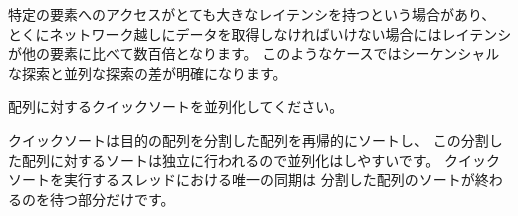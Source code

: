 特定の要素へのアクセスがとても大きなレイテンシを持つという場合があり、
とくにネットワーク越しにデータを取得しなければいけない場合にはレイテンシが他の要素に比べて数百倍となります。
このようなケースではシーケンシャルな探索と並列な探索の差が明確になります。
\medskip
\begin{exercise}
\label{ex/qsort}
配列に対するクイックソートを並列化してください。
\end{exercise}
\begin{answer}
クイックソートは目的の配列を分割した配列を再帰的にソートし、
この分割した配列に対するソートは独立に行われるので並列化はしやすいです。
クイックソートを実行するスレッドにおける唯一の同期は
分割した配列のソートが終わるのを待つ部分だけです。


\end{answer}

